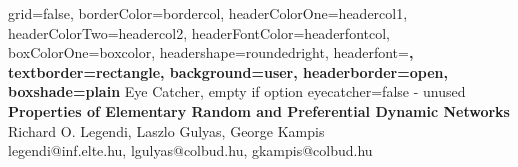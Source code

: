 \documentclass[a0paper,portrait]{baposter}
\begin{document}
\begin{poster}{
  grid=false,
  borderColor=bordercol,
  headerColorOne=headercol1,
  headerColorTwo=headercol2,
  headerFontColor=headerfontcol,
  boxColorOne=boxcolor,
  headershape=roundedright,
  headerfont=\Large\sf\bf,
  textborder=rectangle,
  background=user,
  headerborder=open,
  boxshade=plain
}
{
  Eye Catcher, empty if option eyecatcher=false - unused
}
{\sf\bf
  Properties of Elementary Random and Preferential Dynamic Networks
}
{
  \vspace{1em} Richard O. Legendi, Laszlo Gulyas, George Kampis\\
  {\smaller legendi@inf.elte.hu, lgulyas@colbud.hu, gkampis@colbud.hu}
}
{
\setlength\fboxsep{0pt}
\setlength\fboxrule{0.5pt}
}


\end{poster}
\end{document}
